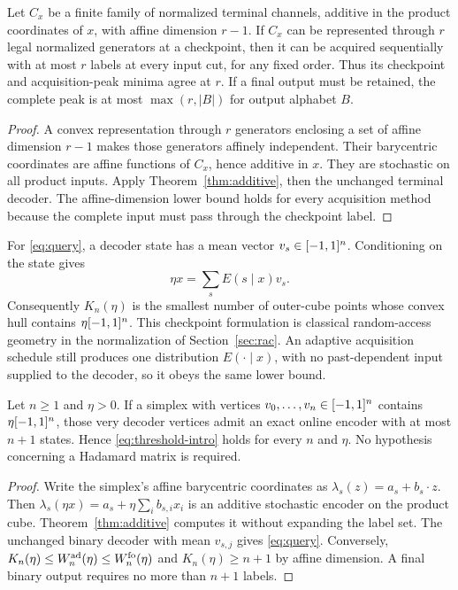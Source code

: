 \begin{corollary}
\label{cor:additive-rank}
Let $C_x$ be a finite family of normalized terminal channels, additive
in the product coordinates of $x$, with affine dimension $r-1$.
If $C_x$ can be represented through $r$ legal normalized generators
at a checkpoint, then it can be acquired sequentially with at most $r$
labels at every input cut, for any fixed order. Thus its checkpoint and
acquisition-peak minima agree at $r$. If a final output must be retained,
the complete peak is at most $\max(r,|B|)$ for output alphabet $B$.
\end{corollary}
\begin{proof}
A convex representation through $r$ generators enclosing a set of affine
dimension $r-1$ makes those generators affinely independent. Their
barycentric coordinates are affine functions of $C_x$, hence additive
in $x$. They are stochastic on all product inputs. Apply
Theorem~\ref{thm:additive}, then the unchanged terminal decoder. The
affine-dimension lower bound holds for every acquisition method because
the complete input must pass through the checkpoint label.
\end{proof}

For \eqref{eq:query}, a decoder state has a mean vector $v_s\in[-1,1]^n$.
Conditioning on the state gives
\begin{equation}\label{eq:cube}
                    \eta x=\sum_s E(s\mid x)v_s.
\end{equation}
Consequently $K_n(\eta)$ is the smallest number of outer-cube points
whose convex hull contains $\eta[-1,1]^n$. This checkpoint formulation
is classical random-access geometry in the normalization of
Section~\ref{sec:rac}. An adaptive acquisition schedule still produces
one distribution $E(\cdot\mid x)$, with no past-dependent input supplied
to the decoder, so it obeys the same lower bound.

\begin{theorem}
\label{thm:all-simplices}
Let $n\ge1$ and $\eta>0$. If a simplex with vertices
$v_0,\ldots,v_n\in[-1,1]^n$ contains $\eta[-1,1]^n$, those very decoder
vertices admit an exact online encoder with at most $n+1$ states.
Hence \eqref{eq:threshold-intro} holds for every $n$ and $\eta$.
No hypothesis concerning a Hadamard matrix is required.
\end{theorem}
\begin{proof}
Write the simplex's affine barycentric coordinates as
$\lambda_s(z)=a_s+b_s\cdot z$. Then
$\lambda_s(\eta x)=a_s+\eta\sum_i b_{s,i}x_i$ is an additive stochastic
encoder on the product cube. Theorem~\ref{thm:additive} computes it
without expanding the label set. The unchanged binary decoder with
mean $v_{s,j}$ gives \eqref{eq:query}. Conversely,
$K_n(\eta)\le W_n^{\rm ad}(\eta)\le W_n^{\rm fo}(\eta)$ and
$K_n(\eta)\ge n+1$ by affine dimension. A final binary output requires
no more than $n+1$ labels.
\end{proof}

